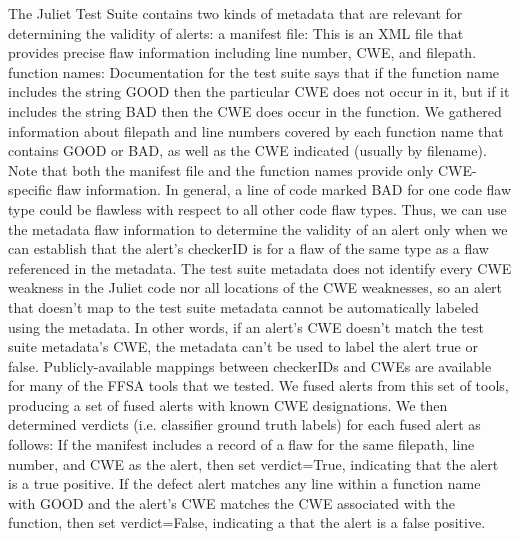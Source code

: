 The Juliet Test Suite contains two kinds of metadata that
are relevant for determining the validity of alerts:
a manifest file: This is an XML file that provides precise
flaw information including line number, CWE, and
filepath.
function names: Documentation for the test suite says
that if the function name includes the string GOOD then
the particular CWE does not occur in it, but if it includes
the string BAD then the CWE does occur in the function.
We gathered information about filepath and line numbers
covered by each function name that contains GOOD or
BAD, as well as the CWE indicated (usually by filename).
Note that both the manifest file and the function names
provide only CWE-specific flaw information. In general, a line
of code marked BAD for one code flaw type could be flawless
with respect to all other code flaw types. Thus, we can use the
metadata flaw information to determine the validity of an alert
only when we can establish that the alert’s checkerID is for a
flaw of the same type as a flaw referenced in the metadata. The
test suite metadata does not identify every CWE weakness in
the Juliet code nor all locations of the CWE weaknesses, so
an alert that doesn’t map to the test suite metadata cannot be
automatically labeled using the metadata. In other words, if
an alert’s CWE doesn’t match the test suite metadata’s CWE,
the metadata can’t be used to label the alert true or false.
Publicly-available mappings between checkerIDs and
CWEs are available for many of the FFSA tools that we tested.
We fused alerts from this set of tools, producing a set of fused
alerts with known CWE designations. We then determined
verdicts (i.e. classifier ground truth labels) for each fused alert
as follows:
If the manifest includes a record of a flaw for the
same filepath, line number, and CWE as the alert, then
set verdict=True, indicating that the alert is a true
positive.
If the defect alert matches any line within a function
name with GOOD and the alert’s CWE matches the CWE
associated with the function, then set verdict=False,
indicating a that the alert is a false positive.


\newpage